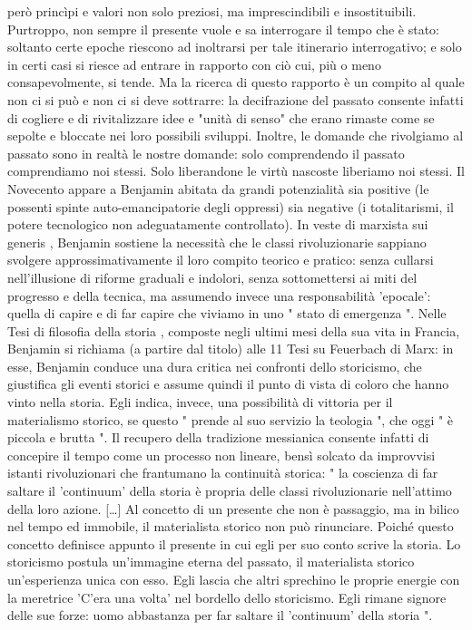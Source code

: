 però princìpi e valori non solo preziosi, ma imprescindibili e insostituibili. Purtroppo, non sempre il presente vuole e sa interrogare il tempo che è stato: soltanto certe epoche riescono ad inoltrarsi per tale itinerario interrogativo; e solo in certi casi si riesce ad entrare in rapporto con ciò cui, più o meno consapevolmente, si tende. Ma la ricerca di questo rapporto è un compito al quale non ci si può e non ci si deve sottrarre: la decifrazione del passato consente infatti di cogliere e di rivitalizzare idee e "unità di senso" che erano rimaste come se sepolte e bloccate nei loro possibili sviluppi. Inoltre, le domande che rivolgiamo al passato sono in realtà le nostre domande: solo comprendendo il passato comprendiamo noi stessi. Solo liberandone le virtù nascoste liberiamo noi stessi. Il Novecento appare a Benjamin abitata da grandi potenzialità sia positive (le possenti spinte auto-emancipatorie degli oppressi) sia negative (i totalitarismi, il potere tecnologico non adeguatamente controllato). In veste di marxista sui generis , Benjamin sostiene la necessità che le classi rivoluzionarie sappiano svolgere approssimativamente il loro compito teorico e pratico: senza cullarsi nell'illusione di riforme graduali e indolori, senza sottomettersi ai miti del progresso e della tecnica, ma assumendo invece una responsabilità 'epocale': quella di capire e di far capire che viviamo in uno " stato di emergenza ". Nelle Tesi di filosofia della storia , composte negli ultimi mesi della sua vita in Francia, Benjamin si richiama (a partire dal titolo) alle 11 Tesi su Feuerbach di Marx: in esse, Benjamin conduce una dura critica nei confronti dello storicismo, che giustifica gli eventi storici e assume quindi il punto di vista di coloro che hanno vinto nella storia. Egli indica, invece, una possibilità di vittoria per il materialismo storico, se questo " prende al suo servizio la teologia ", che oggi " è piccola e brutta ". Il recupero della tradizione messianica consente infatti di concepire il tempo come un processo non lineare, bensì solcato da improvvisi istanti rivoluzionari che frantumano la continuità storica: " la coscienza di far saltare il 'continuum' della storia è propria delle classi rivoluzionarie nell'attimo della loro azione. […] Al concetto di un presente che non è passaggio, ma in bilico nel tempo ed immobile, il materialista storico non può rinunciare. Poiché questo concetto definisce appunto il presente in cui egli per suo conto scrive la storia. Lo storicismo postula un'immagine eterna del passato, il materialista storico un'esperienza unica con esso. Egli lascia che altri sprechino le proprie energie con la meretrice 'C'era una volta' nel bordello dello storicismo. Egli rimane signore delle sue forze: uomo abbastanza per far saltare il 'continuum' della storia ". 
